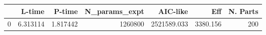 \begin{tabular}{lrrrrrr}
\toprule
{} &    L-time &    P-time &  N\_params\_expt &     AIC-like &       Eff &  N. Parts \\
\midrule
0 &  6.313114 &  1.817442 &        1260800 &  2521589.033 &  3380.156 &       200 \\
\bottomrule
\end{tabular}

